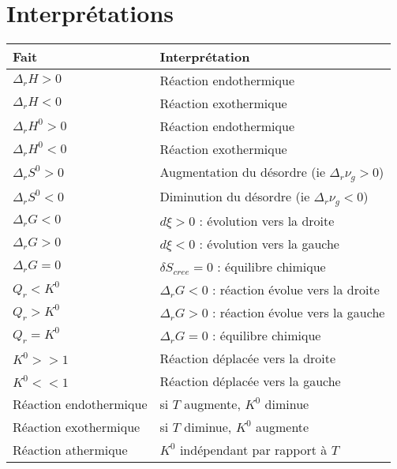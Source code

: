 \documentclass[12pt,a4paper] {article}
\begin{document}
\section{Interprétations}
\begin{tabularx}{\linewidth}{|l|X|} \hline
    \bf{Fait} & \bf{Interprétation} \\ \hline
    $\Delta_r H > 0$ & Réaction endothermique \\ \hline
    $\Delta_r H < 0$ & Réaction exothermique \\ \hline
    $\Delta_r H^0 > 0$ & Réaction endothermique \\ \hline
    $\Delta_r H^0 < 0$ & Réaction exothermique \\ \hline
    $\Delta_r S^0 > 0$ & Augmentation du désordre (ie $\Delta_r \nu_g > 0$) \\ \hline
    $\Delta_r S^0 < 0$ & Diminution du désordre (ie $\Delta_r \nu_g < 0$) \\ \hline
    $\Delta_r G < 0$ & $d\xi > 0$ : évolution vers la droite \\ \hline
    $\Delta_r G > 0$ & $d\xi < 0$ : évolution vers la gauche \\ \hline
    $\Delta_r G = 0$ & $\delta S_{cree} = 0$ : équilibre chimique \\ \hline
    $Q_r < K^0$ & $\Delta_r G < 0$ : réaction évolue vers la droite \\ \hline
    $Q_r > K^0$ & $\Delta_r G > 0$ : réaction évolue vers la gauche \\ \hline
    $Q_r = K^0$ & $\Delta_r G = 0$ : équilibre chimique \\ \hline
    $K^0 >> 1$ & Réaction déplacée vers la droite \\ \hline
    $K^0 << 1$ & Réaction déplacée vers la gauche \\ \hline
    Réaction endothermique & si $T$ augmente, $K^0$ diminue \\ \hline
    Réaction exothermique & si $T$ diminue, $K^0$ augmente \\ \hline
    Réaction athermique & $K^0$ indépendant par rapport à $T$ \\ \hline
\end{tabularx}
\end{document}
